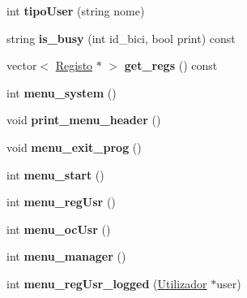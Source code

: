 \begin{DoxyCompactItemize}
\item 
\hypertarget{class_rede_ac74ae338ed2ddb5b8f94c9ed33e172ef}{int {\bfseries tipo\+User} (string nome)}\label{class_rede_ac74ae338ed2ddb5b8f94c9ed33e172ef}

\item 
\hypertarget{class_rede_aba033af0c2cd9a4f70ca1f9459a6a3ee}{string {\bfseries is\+\_\+busy} (int id\+\_\+bici, bool print) const }\label{class_rede_aba033af0c2cd9a4f70ca1f9459a6a3ee}

\item 
\hypertarget{class_rede_a0862364a4ce27c157b2b756184526748}{vector$<$ \hyperlink{class_registo}{Registo} $\ast$ $>$ {\bfseries get\+\_\+regs} () const }\label{class_rede_a0862364a4ce27c157b2b756184526748}

\item 
\hypertarget{class_rede_a906023ec85b2043b4610e627951e93b8}{int {\bfseries menu\+\_\+system} ()}\label{class_rede_a906023ec85b2043b4610e627951e93b8}

\item 
\hypertarget{class_rede_a7f6b41951357f14d8be5c0c23f59bca9}{void {\bfseries print\+\_\+menu\+\_\+header} ()}\label{class_rede_a7f6b41951357f14d8be5c0c23f59bca9}

\item 
\hypertarget{class_rede_ab94437bdbb3cb32b8489591748c1a57e}{void {\bfseries menu\+\_\+exit\+\_\+prog} ()}\label{class_rede_ab94437bdbb3cb32b8489591748c1a57e}

\item 
\hypertarget{class_rede_ad5f01d997329c28cc736b42e9962c2b6}{int {\bfseries menu\+\_\+start} ()}\label{class_rede_ad5f01d997329c28cc736b42e9962c2b6}

\item 
\hypertarget{class_rede_aa36d94723cae863269eb20375c4491c4}{int {\bfseries menu\+\_\+reg\+Usr} ()}\label{class_rede_aa36d94723cae863269eb20375c4491c4}

\item 
\hypertarget{class_rede_a8865f7a80236b7a399e948a486c86bac}{int {\bfseries menu\+\_\+oc\+Usr} ()}\label{class_rede_a8865f7a80236b7a399e948a486c86bac}

\item 
\hypertarget{class_rede_a71b157db8d1ec17c2e5100faeb95e3d2}{int {\bfseries menu\+\_\+manager} ()}\label{class_rede_a71b157db8d1ec17c2e5100faeb95e3d2}

\item 
\hypertarget{class_rede_af5dd3d55b3cb2f252349128787a96e27}{int {\bfseries menu\+\_\+reg\+Usr\+\_\+logged} (\hyperlink{class_utilizador}{Utilizador} $\ast$user)}\label{class_rede_af5dd3d55b3cb2f252349128787a96e27}


\end{DoxyCompactItemize}
